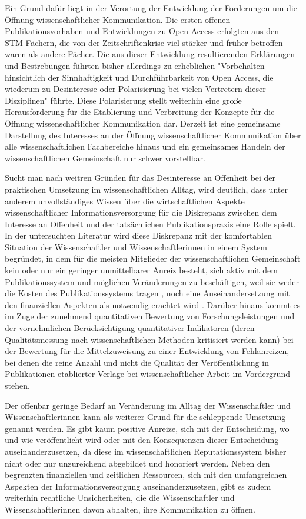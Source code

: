 Ein Grund dafür liegt in der Verortung der Entwicklung der Forderungen um die Öffnung wissenschaftlicher Kommunikation. Die ersten offenen Publikationsvorhaben und Entwicklungen zu Open Access erfolgten aus den STM-Fächern, die von der Zeitschriftenkrise viel stärker und früher betroffen waren als andere Fächer. Die aus dieser Entwicklung resultierenden Erklärungen und Bestrebungen führten bisher allerdings zu erheblichen "Vorbehalten hinsichtlich der Sinnhaftigkeit und Durchführbarkeit von Open Access, die wiederum zu Desinteresse oder Polarisierung bei vielen Vertretern dieser Disziplinen" \cite{Naeder_2010} führte. Diese Polarisierung stellt weiterhin eine große Herausforderung für die Etablierung und Verbreitung der Konzepte für die Öffnung wissenschaftlicher Kommunikation dar. Derzeit ist eine gemeinsame Darstellung des Interesses an der Öffnung wissenschaftlicher Kommunikation über alle wissenschaftlichen Fachbereiche hinaus und ein gemeinsames Handeln der wissenschaftlichen Gemeinschaft nur schwer vorstellbar.

Sucht man nach weitren Gründen für das Desinteresse an Offenheit bei der praktischen Umsetzung im wissenschaftlichen Alltag, wird deutlich, dass unter anderem unvollständiges Wissen über die wirtschaftlichen Aspekte wissenschaftlicher Informationsversorgung für die Diskrepanz zwischen dem Interesse an Offenheit und der tatsächlichen Publikationspraxis eine Rolle spielt. In der untersuchten Literatur wird diese Diskrepanz mit der komfortablen Situation der Wissenschaftler und Wissenschaftlerinnen in einem System begründet, in dem für die meisten Mitglieder der wissenschaftlichen Gemeinschaft kein oder nur ein geringer unmittelbarer Anreiz besteht, sich aktiv mit dem Publikationssystem und möglichen Veränderungen zu beschäftigen, weil sie weder die Kosten des Publikationssystems tragen \cite{Sietmann_2007}, noch eine Auseinandersetzung mit den finanziellen Aspekten als notwendig erachtet wird \cite{herb_2010}. Darüber hinaus kommt es im Zuge der zunehmend quantitativen Bewertung von Forschungsleistungen und der vornehmlichen Berücksichtigung quantitativer Indikatoren (deren Qualitätsmessung nach wissenschaftlichen Methoden kritisiert werden kann) bei der Bewertung für die Mittelzuweisung zu einer Entwicklung von Fehlanreizen, bei denen die reine Anzahl und nicht die Qualität der Veröffentlichung in Publikationen etablierter Verlage bei wissenschaftlicher Arbeit im Vordergrund stehen.

Der offenbar geringe Bedarf an Veränderung im Alltag der Wissenschaftler und Wissenschaftlerinnen kann als weiterer Grund für die schleppende Umsetzung genannt werden. Es gibt kaum positive Anreize, sich mit der Entscheidung, wo und wie veröffentlicht wird oder mit den Konsequenzen dieser Entscheidung auseinanderzusetzen, da diese im wissenschaftlichen Reputationssystem bisher nicht oder nur unzureichend abgebildet und honoriert werden. Neben den begrenzten finanziellen und zeitlichen Ressourcen, sich mit den umfangreichen Aspekten der Informationsversorgung auseinanderzusetzen, gibt es zudem weiterhin rechtliche Unsicherheiten, die die Wissenschaftler und Wissenschaftlerinnen davon abhalten, ihre Kommunikation zu öffnen.

